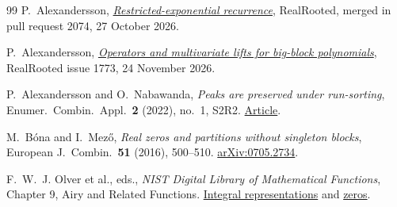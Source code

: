 \documentclass[11pt]{article}
\begin{document}
\begin{thebibliography}{99}
P.~Alexandersson,
\href{https://github.com/PerAlexandersson/RealRooted/blob/d34c13585e69912d443ecb973d9b78733dd9a052/RealRooted/CombinatorialExamples/RestrictedExponential.lean}{\emph{Restricted-exponential recurrence}},
RealRooted, merged in pull request 2074, 27 October 2026.

P.~Alexandersson,
\href{https://github.com/PerAlexandersson/RealRooted/issues/1773\#issuecomment-7141592644}{\emph{Operators and multivariate lifts for big-block polynomials}},
RealRooted issue 1773, 24 November 2026.

P.~Alexandersson and O.~Nabawanda, \emph{Peaks are preserved under run-sorting},
Enumer.\ Combin.\ Appl.\ \textbf{2} (2022), no.~1, S2R2.
\href{https://doi.org/10.54550/ECA2022V2S2R2}{Article}.

M.~B\'ona and I.~Mez\H{o}, \emph{Real zeros and partitions without singleton blocks},
European J.\ Combin.\ \textbf{51} (2016), 500--510.
\href{https://arxiv.org/abs/0705.2734}{arXiv:0705.2734}.

F.~W.~J. Olver et al., eds., \emph{NIST Digital Library of Mathematical Functions},
Chapter 9, Airy and Related Functions.
\href{https://dlmf.nist.gov/9.5}{Integral representations} and
\href{https://dlmf.nist.gov/9.9}{zeros}.
\end{thebibliography}
\endgroup
\end{document}
